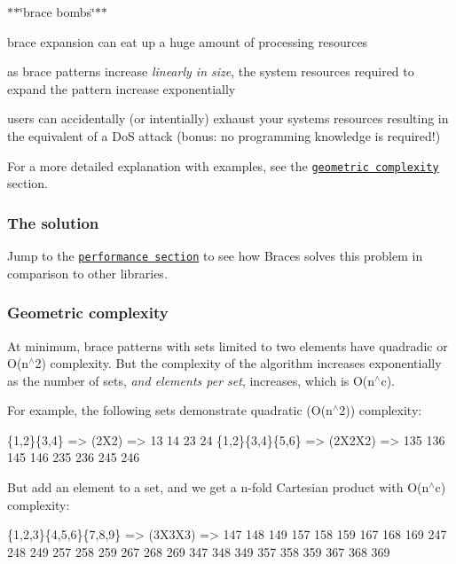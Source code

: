$\ast$$\ast$\char`\"{}brace bombs\char`\"{}$\ast$$\ast$


\begin{DoxyItemize}
\item brace expansion can eat up a huge amount of processing resources
\item as brace patterns increase {\itshape linearly in size}, the system resources required to expand the pattern increase exponentially
\item users can accidentally (or intentially) exhaust your system\textquotesingle{}s resources resulting in the equivalent of a DoS attack (bonus\+: no programming knowledge is required!)
\end{DoxyItemize}

For a more detailed explanation with examples, see the \href{#geometric-complexity}{\tt geometric complexity} section.

\subsubsection*{The solution}

Jump to the \href{#performance}{\tt performance section} to see how Braces solves this problem in comparison to other libraries.

\subsubsection*{Geometric complexity}

At minimum, brace patterns with sets limited to two elements have quadradic or {\ttfamily O(n$^\wedge$2)} complexity. But the complexity of the algorithm increases exponentially as the number of sets, {\itshape and elements per set}, increases, which is {\ttfamily O(n$^\wedge$c)}.

For example, the following sets demonstrate quadratic ({\ttfamily O(n$^\wedge$2)}) complexity\+:


\begin{DoxyCode}
\{1,2\}\{3,4\}      => (2X2)    => 13 14 23 24
\{1,2\}\{3,4\}\{5,6\} => (2X2X2)  => 135 136 145 146 235 236 245 246
\end{DoxyCode}


But add an element to a set, and we get a n-\/fold Cartesian product with {\ttfamily O(n$^\wedge$c)} complexity\+:


\begin{DoxyCode}
\{1,2,3\}\{4,5,6\}\{7,8,9\} => (3X3X3) => 147 148 149 157 158 159 167 168 169 247 248 
                                    249 257 258 259 267 268 269 347 348 349 357 
                                    358 359 367 368 369
\end{DoxyCode}


